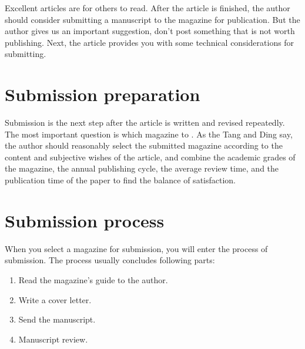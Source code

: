 


Excellent articles are for others to read. After the article is finished, the author should consider submitting a manuscript to the magazine for publication. But the author gives us an important suggestion, don't post something that is not worth publishing. Next, the article provides you with some technical considerations for submitting. 


\section{Submission preparation}
Submission is the next step after the article is written and revised repeatedly. The most important question is which magazine to . As the Tang and Ding say, the author should reasonably select the submitted magazine according to the content and subjective wishes of the article, and combine the academic grades of the magazine, the annual publishing cycle, the average review time, and the publication time of the paper to find the balance of satisfaction.


\section{Submission process}
When you select a magazine for submission, you will enter the process of submission. The process usually concludes  following parts:
\begin{enumerate}
	\item Read the magazine's guide to the author.
	\item Write a cover letter.
	\item Send the manuscript.
	\item Manuscript review.
\end{enumerate}


